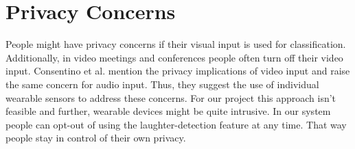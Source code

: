 \documentclass[bsc,frontabs,parskip,deptreport]{infthesis}
\begin{document}
\section{Privacy Concerns}\label{privacy-concerns}
People might have privacy concerns if their visual input is used for classification.
Additionally, in video meetings and conferences people often turn off their video input.
Consentino et al. \cite{cosentino2016quantitative}  mention the privacy implications of video input and raise the same concern for audio input.
Thus, they suggest the use of individual wearable sensors to address these concerns.
For our project this approach isn't feasible and further, wearable devices might be quite intrusive.
In our system people can opt-out of using the laughter-detection feature at any time.
That way people stay in control of their own privacy.




%
%
%
\end{document}
